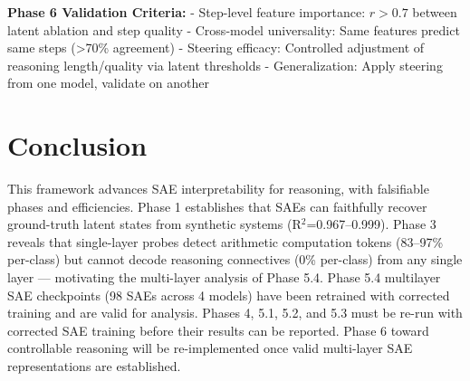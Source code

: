 \documentclass{article}
\begin{document}
\textbf{Phase 6 Validation Criteria:}
- Step-level feature importance: $r > 0.7$ between latent ablation and step quality
- Cross-model universality: Same features predict same steps (>70\% agreement)
- Steering efficacy: Controlled adjustment of reasoning length/quality via latent thresholds
- Generalization: Apply steering from one model, validate on another

\section{Conclusion}
This framework advances SAE interpretability for reasoning, with falsifiable phases and efficiencies. Phase 1 establishes that SAEs can faithfully recover ground-truth latent states from synthetic systems (R$^2$=0.967--0.999). Phase 3 reveals that single-layer probes detect arithmetic computation tokens (83--97\% per-class) but cannot decode reasoning connectives (0\% per-class) from any single layer --- motivating the multi-layer analysis of Phase 5.4. Phase 5.4 multilayer SAE checkpoints (98 SAEs across 4 models) have been retrained with corrected training and are valid for analysis. Phases 4, 5.1, 5.2, and 5.3 must be re-run with corrected SAE training before their results can be reported. Phase 6 toward controllable reasoning will be re-implemented once valid multi-layer SAE representations are established.
\end{document}
